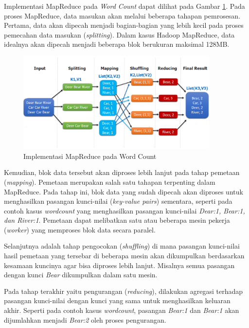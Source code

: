 Implementasi MapReduce pada \textit{Word Count}\cite{KOMPARASIKECEPATANHADOOP} dapat dilihat pada Gambar \ref{fig:mapreduce-wordcount}. Pada proses MapReduce, data masukan akan melalui beberapa tahapan pemrosesan. Pertama, data akan dipecah menjadi bagian-bagian yang lebih kecil pada proses pemecahan data masukan (\textit{splitting}). Dalam kasus Hadoop MapReduce, data idealnya akan dipecah menjadi beberapa blok berukuran maksimal 128MB.

\begin{figure}[h!]
    \centering
    \includegraphics[width=0.9\textwidth]{figures/ch02/map-reduce-word-count-oreilly.png}
    \caption{Implementasi MapReduce pada Word Count \cite{MapReduceDistributedComputing}}
    \label{fig:mapreduce-wordcount}
\end{figure}

Kemudian, blok data tersebut akan diproses lebih lanjut pada tahap pemetaan (\textit{mapping}). Pemetaan merupakan salah satu tahapan terpenting dalam MapReduce. Pada tahap ini, blok data yang sudah dipecah akan diproses untuk menghasilkan pasangan kunci-nilai (\textit{key-value pairs}) sementara, seperti pada contoh kasus \textit{wordcount} yang menghasilkan pasangan kunci-nilai \textit{Dear:1, Bear:1, dan River:1}. Pemetaan dapat melibatkan satu atau beberapa mesin pekerja (\textit{worker}) yang memproses blok data secara paralel.

Selanjutnya adalah tahap pengocokan (\textit{shuffling}) di mana pasangan kunci-nilai hasil pemetaan yang tersebar di beberapa mesin akan dikumpulkan berdasarkan kesamaan kuncinya agar bisa diproses lebih lanjut. Misalnya semua pasangan dengan kunci \textit{Bear} dikumpulkan dalam satu mesin.

Pada tahap terakhir yaitu pengurangan (\textit{reducing}), dilakukan agregasi terhadap pasangan kunci-nilai dengan kunci yang sama untuk menghasilkan keluaran akhir. Seperti pada contoh kasus \textit{wordcount}, pasangan \textit{Bear:1} dan \textit{Bear:1} akan dijumlahkan menjadi \textit{Bear:2} oleh proses pengurangan.

